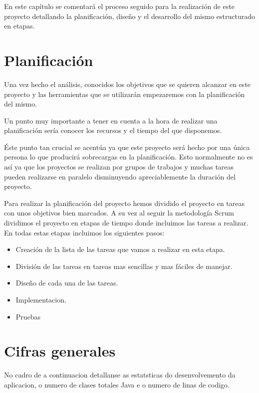 

 En este capítulo se comentará el proceso seguido para la realización de este proyecto detallando la planificación, diseño y el desarrollo del mismo estructurado en etapas.
 
\section{Planificación}

Una vez hecho el análisis, conocidos los objetivos que se quieren alcanzar en este proyecto y las herramientas que se utilizarán  empezaremos con la planificación del mismo.

Un punto muy  importante a tener en cuenta a la hora de realizar una planificación sería conocer los recursos y el tiempo del que disponemos.




Éste punto tan crucial se acentúa ya que este proyecto será hecho por una única persona lo que producirá sobrecargas en la planificación. Esto normalmente no es así ya que los proyectos se realizan por grupos de trabajos y muchas tareas pueden realizarse en paralelo disminuyendo apreciablemente la duración del proyecto.

Para realizar la planificación del proyecto hemos dividido el proyecto en tareas con unos objetivos bien marcados. A su vez al seguir la metodología Scrum dividimos el proyecto en etapas de tiempo  donde incluimos las tareas a realizar.
En todas estas etapas incluimos los siguientes pasos:
 
 


\begin{itemize}
\item Creación de la lista de las tareas que vamos a realizar en esta etapa.
\item  División de las tareas en tareas mas sencillas y mas fáciles de manejar.



\item Diseño de cada una de las tareas.
\item  Implementacion.
\item Pruebas
\end{itemize}

\section{Cifras generales}
No cadro de a continuacion detallanse as estatsticas do desenvolvemento da aplicacion,
o numero de clases totales Java e o numero de linas de codigo.


